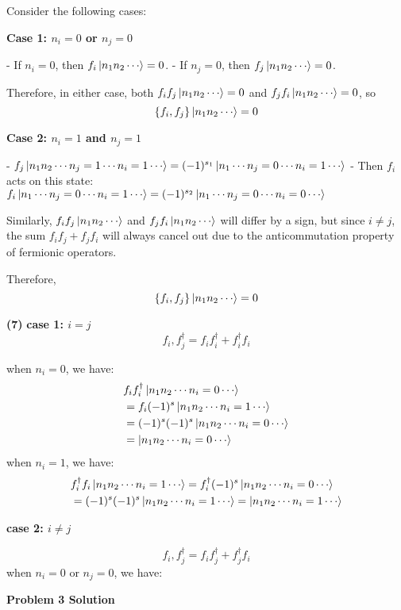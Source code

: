 \documentclass[12pt]{article}
\begin{document}
Consider the following cases:

\textbf{Case 1: $n_i = 0$ or $n_j = 0$}

- If $n_i = 0$, then $f_i \ket{n_1 n_2 \cdots} = 0$.
- If $n_j = 0$, then $f_j \ket{n_1 n_2 \cdots} = 0$.

Therefore, in either case, both $f_i f_j \ket{n_1 n_2 \cdots} = 0$ and $f_j f_i \ket{n_1 n_2 \cdots} = 0$, so
\[
\{f_i, f_j\} \ket{n_1 n_2 \cdots} = 0
\]

\textbf{Case 2: $n_i = 1$ and $n_j = 1$}

- $f_j \ket{n_1 n_2 \cdots n_j = 1 \cdots n_i = 1 \cdots} = (-1)^{s_1} \ket{n_1 \cdots n_j = 0 \cdots n_i = 1 \cdots}$
- Then $f_i$ acts on this state: $f_i \ket{n_1 \cdots n_j = 0 \cdots n_i = 1 \cdots} = (-1)^{s_2} \ket{n_1 \cdots n_j = 0 \cdots n_i = 0 \cdots}$

Similarly, $f_i f_j \ket{n_1 n_2 \cdots}$ and $f_j f_i \ket{n_1 n_2 \cdots}$ will differ by a sign, but since $i \neq j$, the sum $f_i f_j + f_j f_i$ will always cancel out due to the anticommutation property of fermionic operators.

Therefore,
\[
\{f_i, f_j\} \ket{n_1 n_2 \cdots} = 0
\]

\textbf{(7)}
\textbf{case 1: $i=j$}
\[
{f_i,f_j^\dagger} = f_i f_i^\dagger + f_i^\dagger f_i
\]

when $ n_i=0$, we have:
\[
\begin{aligned}
&f_i f_i^\dagger \ket{n_1 n_2 \cdots n_i=0 \cdots}  \\
&=f_i (-1)^s \ket{n_1 n_2 \cdots n_i=1 \cdots}  \\
&=(-1)^s (-1)^s \ket{n_1 n_2 \cdots n_i=0 \cdots} \\
&=\ket{n_1 n_2 \cdots n_i=0 \cdots} \\
\end{aligned}
\]
when $ n_i=1$, we have: 
\[\begin{aligned}
&f_i^\dagger f_i \ket{n_1 n_2 \cdots n_i=1 \cdots} = f_i^\dagger (-1)^s \ket{n_1 n_2 \cdots n_i=0 \cdots} \\
&=(-1)^s (-1)^s \ket{n_1 n_2 \cdots n_i=1 \cdots}=\ket{n_1 n_2 \cdots n_i=1 \cdots}\\
\end{aligned}
\]


\textbf{case 2: $i\neq j$}

\[{f_i,f_j^\dagger} = f_i f_j^\dagger + f_j^\dagger f_i\]
when $ n_i=0$ or $n_j=0$, we have:
\begin{center}
    \textbf{Problem 3 Solution}
\end{center}
\end{document}
